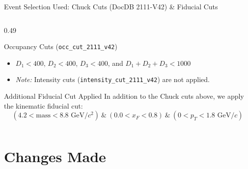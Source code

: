 \documentclass[aspectratio=169, 10pt]{beamer}
\begin{document}
\begin{frame}{Event Selection Used: Chuck Cuts (DocDB 2111-V42) \& Fiducial Cuts}
\begin{columns}[T, onlytextwidth]
\begin{column}{0.49\textwidth}
        \begin{block}{\scriptsize Occupancy Cuts (\texttt{occ\_cut\_2111\_v42})}
            \tiny
            \begin{itemize}
                \item $D_1 < 400$, $D_2 < 400$, $D_3 < 400$, and $D_1 + D_2 + D_3 < 1000$
                \item \textit{Note:} Intensity cuts (\texttt{intensity\_cut\_2111\_v42}) are not applied.
            \end{itemize}
        \end{block}

        \begin{alertblock}{\scriptsize Additional Fiducial Cut Applied}
            \tiny
            In addition to the Chuck cuts above, we apply the kinematic fiducial cut:
            \[
                (4.2 < \text{mass} < 8.8\text{ GeV}/c^2) \ \& \ (0.0 < x_F < 0.8) \ \& \ (0 < p_T < 1.8\text{ GeV}/c)
            \]
        \end{alertblock}
    \end{column}
\end{columns}
\normalsize
\end{frame}


\section{Changes Made}
\end{document}
